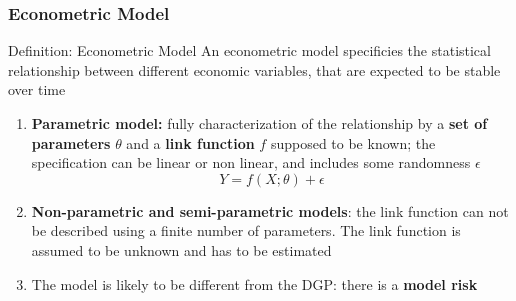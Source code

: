 \documentclass{beamer}
\begin{document}
\begin{frame}
  \frametitle{Econometric Model}

  \begin{block}{Definition: Econometric Model}
    An econometric model specificies the statistical relationship between different economic variables, that are expected to be stable over time
  \end{block}

  \begin{enumerate}
  \item \textbf{Parametric model:} fully characterization of the relationship by a \textbf{set of parameters} $\theta$ and a \textbf{link function} $f$ supposed to be known; the specification can be linear or non linear, and includes some randomness $\epsilon$
    \begin{equation*}
      Y = f(X; \theta) + \epsilon
    \end{equation*}

  \item \textbf{Non-parametric and semi-parametric models}: the link function can not be described using a finite number of parameters. The link function is assumed to be unknown and has to be estimated
    
  \item The model is likely to be different from the DGP: there is a \textbf{model risk}
    
  \end{enumerate}
\end{frame}
\end{document}
